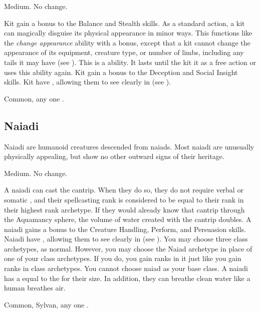          Medium.
         No change.
        \begin{itemize}
             Kit gain a  bonus to the Balance and Stealth skills.
             As a standard action, a kit can magically disguise its physical appearance in minor ways.
                This functions like the \textit{change appearance} ability with a  bonus, except that a kit cannot change the appearance of its equipment, creature type, or number of limbs, including any tails it may have (see ).
                This is a \magical ability.
                It lasts until the kit  it as a free action or uses this ability again.
             Kit gain a  bonus to the Deception and Social Insight skills.
             Kit have , allowing them to see clearly in  (see ).
        \end{itemize}
         Common, any one .

    \subsection{Naiadi}
        Naiadi are humanoid creatures descended from naiads.
        Most naiadi are unusually physically appealing, but show no other outward signs of their heritage.

         Medium.
         No change.
        \begin{itemize}
             A naiadi can cast the  cantrip.
                When they do so, they do not require verbal or somatic , and their spellcasting rank is considered to be equal to their rank in their highest rank archetype.
                If they would already know that cantrip through the Aquamancy sphere, the volume of water created with the cantrip doubles.
             A naiadi gains a  bonus to the Creature Handling, Perform, and Persuasion skills.
             Naiadi have , allowing them to see clearly in  (see ).
             You may choose three class archetypes, as normal.
                However, you may choose the Naiad archetype in place of one of your class archetypes.
                If you do, you gain ranks in it just like you gain ranks in class archetypes.
                You cannot choose naiad as your base class.
             A naiadi has a  equal to the  for their size.
                In addition, they can breathe clean water like a human breathes air.
        \end{itemize}
         Common, Sylvan, any one .

